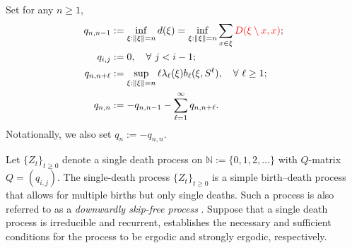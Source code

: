 \documentclass[12pt]{article}
\newcommand{\N}{\mathbb{N}}
\newcommand{\red}[1]{\textcolor{red}{#1}}
\newcounter{con}%
\numberwithin{equation}{section}
\begin{document}
Set for any $n\ge1$, 
\begin{align}
	q_{n,n-1}&:=\inf_{\xi:\|\xi\|=n}d(\xi)=\inf_{\xi:\|\xi\|=n}\sum_{x\in\xi}\red{D(\xi\setminus x,x)};\label{qmatrix1}\\
	q_{i,j}&:=0,~~~\forall~j<i-1;\\
	q_{n,n+\ell}&:=\sup_{\xi:\|\xi\|=n}\ell\lambda_\ell(\xi) b_{\ell}(\xi,S^{\ell}),~~~\forall~\ell\ge1;\\
	q_{n,n}&:=-q_{n,n-1}-\sum_{\ell=1}^{\infty}q_{n,n+\ell}.\label{qmatrix4}
\end{align}
Notationally, we also set $q_n:=-q_{n,n}$. 

Let $\{Z_t\}_{t\ge0}$ denote a single death process on $\N:=\{0,1,2,\dots\}$ with $Q$-matrix $Q=(q_{i,j})$.
The single-death process $\{Z_t\}_{t \ge 0}$ is a simple birth--death process that allows for multiple births but only single deaths. Such a process is also referred to as a \emph{downwardly skip-free process} \cite{CPZC05}.
Suppose that a single death process is irreducible and recurrent, \cite[Theorem~1.1]{Zhang18} establishes the necessary and sufficient conditions for the process to be ergodic and strongly ergodic, respectively.
\end{document}
